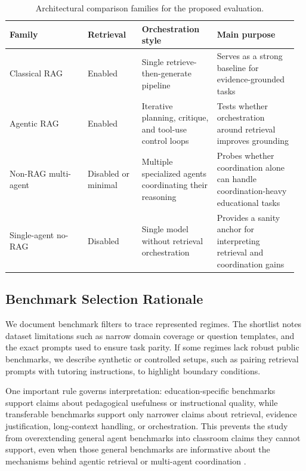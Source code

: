 \begin{table}[t]
\centering
\small
\begingroup
\setlength{\tabcolsep}{5pt}
\begin{tabular}{@{}>{\raggedright\arraybackslash}p{0.26\linewidth}>{\raggedright\arraybackslash}p{0.18\linewidth}>{\raggedright\arraybackslash}p{0.25\linewidth}>{\raggedright\arraybackslash}p{0.27\linewidth}@{}}
\toprule
Family & Retrieval & Orchestration style & Main purpose \\
\midrule
Classical RAG & Enabled & Single retrieve-then-generate pipeline & Serves as a strong baseline for evidence-grounded tasks \\
Agentic RAG & Enabled & Iterative planning, critique, and tool-use control loops & Tests whether orchestration around retrieval improves grounding \\
Non-RAG multi-agent & Disabled or minimal & Multiple specialized agents coordinating their reasoning & Probes whether coordination alone can handle coordination-heavy educational tasks \\
Single-agent no-RAG & Disabled & Single model without retrieval orchestration & Provides a sanity anchor for interpreting retrieval and coordination gains \\
\bottomrule
\end{tabular}
\endgroup
\caption{Architectural comparison families for the proposed evaluation.}
\label{tab:comparison-families}
\end{table}

\subsection{Benchmark Selection Rationale}

We document benchmark filters to trace represented regimes. The shortlist notes dataset limitations such as narrow domain coverage or question templates, and the exact prompts used to ensure task parity. If some regimes lack robust public benchmarks, we describe synthetic or controlled setups, such as pairing retrieval prompts with tutoring instructions, to highlight boundary conditions.

One important rule governs interpretation: education-specific benchmarks support claims about pedagogical usefulness or instructional quality, while transferable benchmarks support only narrower claims about retrieval, evidence justification, long-context handling, or orchestration. This prevents the study from overextending general agent benchmarks into classroom claims they cannot support, even when those general benchmarks are informative about the mechanisms behind agentic retrieval or multi-agent coordination \cite{thakur2021beir,liu2023agentbench}.

